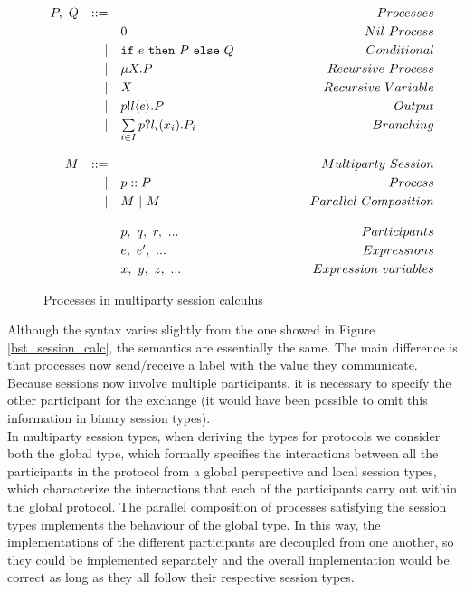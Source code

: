 \documentclass[12pt,twoside]{report}
\newcommand{\white}{\ \ \ \ \ \ \ \ \ \ \ \ }
\begin{document}
\begin{figure}[h]
    \centering
    \begin{equation*}
    \centering
    \begin{array}{rrlcr}
        P,\ Q & ::= && \white & Processes \\[2.75pt]
             &   & 0 & \white & Nil\ Process  \\[2.75pt]
             
             & | & \texttt{if}\ e\ \texttt{then}\ P\ \texttt{else}\ Q & \white & Conditional \\[2.75pt]
             & | & \mu X.P & \white  & Recursive\ Process \\[2.75pt]
             & | & X & \white  & Recursive\ Variable\\[2.75pt]
             & | & p!l \langle e \rangle.P & \white & Output \\[2.75pt]
             & | & \sum\limits_{i \in I} p?l_i(x_i).P_i & \white & Branching \\\\

        M & ::= &&& Multiparty\ Session\\[2.75pt]
        & | & p :: P\ & \white & Process\\[2.75pt]
        & | & M\ |\ M\ & \white & Parallel\ Composition\\\\
        
        &&p,\ q,\ r,\ ... & \white & Participants\\[2.75pt]
        &&e,\ e',\ ... & \white & Expressions\\[2.75pt]
        &&x,\ y,\ z,\ ... & \white & Expression\  variables
        \end{array}
    \end{equation*}
    \caption{Processes in multiparty session calculus}
    \label{MPST_processes}
\end{figure}{}

Although the syntax varies slightly from the one showed in Figure \ref{bst_session_calc}, the semantics are essentially the same. The main difference is that processes now send/receive a label with the value they communicate. Because sessions now involve multiple participants, it is necessary to specify the other participant for the exchange (it would have been possible to omit this information in binary session types). \\

In multiparty session types, when deriving the types for protocols we consider both the global type, which formally specifies the interactions between all the participants in the protocol from a global perspective and local session types, which characterize the interactions that each of the participants carry out within the global protocol. The parallel composition of processes satisfying the session types implements the behaviour of the global type. In this way, the implementations of the different participants are decoupled from one another, so they could be implemented separately and the overall implementation would be correct as long as they all follow their respective session types.
\end{document}
